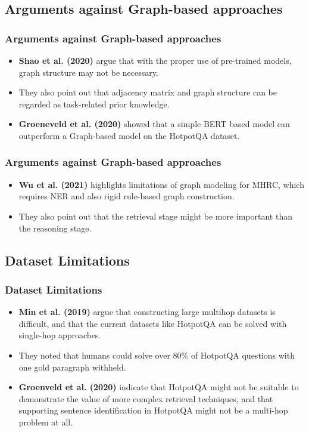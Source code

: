 \documentclass[10pt]{beamer}
\begin{document}
\subsection{Arguments against Graph-based approaches}

\begin{frame}
  \frametitle{Arguments against Graph-based approaches}
  \begin{itemize}
    \item \textbf{Shao et al. (2020)} \cite{RN127} argue that with the proper use of pre-trained models, graph structure may not be necessary.
    \item They also point out that adjacency matrix and graph structure can be regarded as task-related prior knowledge.
    \item \textbf{Groeneveld et al. (2020)} \cite{RN126} showed that a simple BERT based model can outperform a Graph-based model on the HotpotQA dataset.
  \end{itemize}

\end{frame}

\begin{frame}
  \frametitle{Arguments against Graph-based approaches}
  \begin{itemize}
    \item \textbf{Wu et al. (2021)} \cite{RN106} highlights limitations of graph modeling for MHRC, which requires NER and also rigid rule-based graph construction.
    \item They also point out that the retrieval stage might be more important than the reasoning stage.
  \end{itemize}

\end{frame}

\subsection{Dataset Limitations}

\begin{frame}
  \frametitle{Dataset Limitations}
  \begin{itemize}
    \item \textbf{Min et al. (2019)} \cite{RN150} argue that constructing large multihop datasets is difficult, and that the current datasets like HotpotQA can be solved with single-hop approaches.
    \item They noted that humans could solve over 80\% of HotpotQA questions with one gold paragraph withheld.
    \item \textbf{Groenveld et al. (2020)} indicate that HotpotQA might not be suitable to demonstrate the value of more complex retrieval techniques, and that supporting sentence identification in HotpotQA might not be a multi-hop problem at all.
  \end{itemize}
  
\end{frame}
\end{document}
